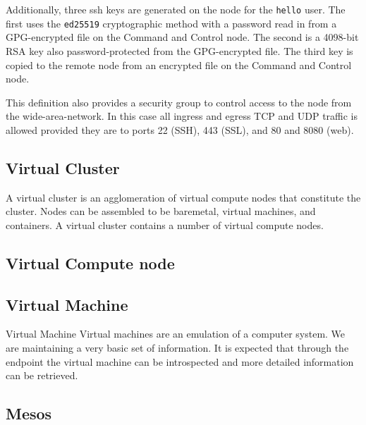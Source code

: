 \documentclass[9pt,twocolumn,twoside]{styles/osajnl}
\begin{document}
Additionally, three ssh keys are generated on the node for the
\verb|hello| user. The first uses the \verb|ed25519| cryptographic
method with a password read in from a GPG-encrypted file on the
Command and Control node. The second is a 4098-bit RSA key also
password-protected from the GPG-encrypted file. The third key is
copied to the remote node from an encrypted file on the Command and
Control node.

This definition also provides a security group to control access to
the node from the wide-area-network. In this case all ingress and
egress TCP and UDP traffic is allowed provided they are to ports 22
(SSH), 443 (SSL), and 80 and 8080 (web).





\subsection{Virtual Cluster}

A virtual cluster is an agglomeration of virtual compute nodes that
constitute the cluster. Nodes can be assembled to be baremetal,
virtual machines, and containers. A virtual cluster contains a number
of virtual compute nodes.  
 

\subsection{Virtual Compute node}


\subsection{Virtual Machine}

Virtual Machine 
Virtual machines are an emulation of a computer system. We are maintaining a very basic set of information. It is expected that through the endpoint the virtual machine can be introspected and more detailed information can be retrieved. 


\subsection{Mesos}
\end{document}
